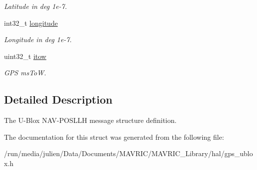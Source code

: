\begin{DoxyCompactItemize}
\begin{DoxyCompactList}\small\item\em Latitude in deg 1e-\/7. \end{DoxyCompactList}\item 
\hypertarget{structubx__nav__pos__llh__t_add75ad81a71d1afee4db2c031b8a073e}{int32\+\_\+t \hyperlink{structubx__nav__pos__llh__t_add75ad81a71d1afee4db2c031b8a073e}{longitude}}\label{structubx__nav__pos__llh__t_add75ad81a71d1afee4db2c031b8a073e}

\begin{DoxyCompactList}\small\item\em Longitude in deg 1e-\/7. \end{DoxyCompactList}\item 
\hypertarget{structubx__nav__pos__llh__t_ae67928fcfc201826b69fc6d4263db8a9}{uint32\+\_\+t \hyperlink{structubx__nav__pos__llh__t_ae67928fcfc201826b69fc6d4263db8a9}{itow}}\label{structubx__nav__pos__llh__t_ae67928fcfc201826b69fc6d4263db8a9}

\begin{DoxyCompactList}\small\item\em G\+P\+S ms\+To\+W. \end{DoxyCompactList}\end{DoxyCompactItemize}


\subsection{Detailed Description}
The U-\/\+Blox N\+A\+V-\/\+P\+O\+S\+L\+L\+H message structure definition. 

The documentation for this struct was generated from the following file\+:\begin{DoxyCompactItemize}
\item 
/run/media/julien/\+Data/\+Documents/\+M\+A\+V\+R\+I\+C/\+M\+A\+V\+R\+I\+C\+\_\+\+Library/hal/gps\+\_\+ublox.\+h\end{DoxyCompactItemize}

